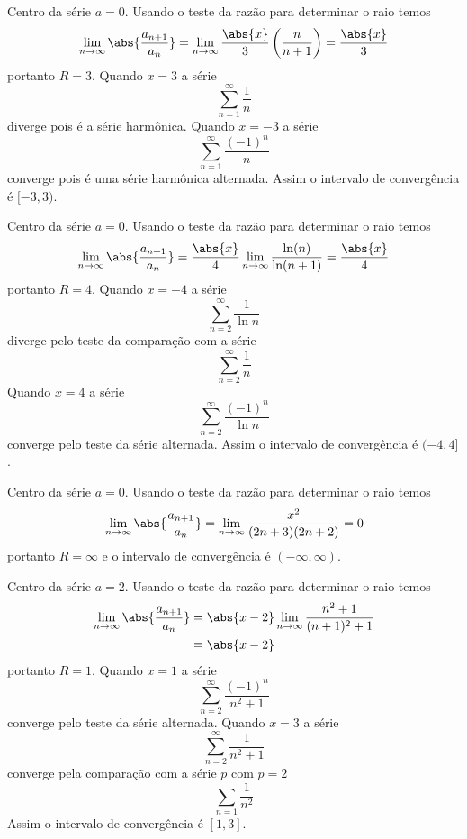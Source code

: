 \begin{exercises}
\begin{exercise}
\begin{answer}
\begin{alphalist}
  \item Centro da série $a=0$.
  Usando o teste da razão para determinar o raio temos
  \[
    \lim_{n\to\infty}\abs{\frac{a_{n+1}}{a_n}} =
    \lim_{n\to\infty} \frac{\abs{x}}{3}\left(\frac{n}{n+1}\right) =
    \frac{\abs{x}}{3}
  \]
  portanto $R=3$.
  Quando $x= 3$ a série
  \[
    \sum_{n=1}^{\infty} \frac{1}{n}
  \]
  diverge pois é a série harmônica.
  Quando $x=-3$ a série
  \[
    \sum_{n=1}^{\infty} \frac{(-1)^n}{n}
  \]
  converge pois é uma série harmônica alternada.
  Assim o intervalo de convergência é $[-3, 3)$.

  \item Centro da série $a=0$.
  Usando o teste da razão para determinar o raio temos
  \[
    \lim_{n\to\infty}\abs{\frac{a_{n+1}}{a_n}} =
    \frac{\abs{x}}{4}\lim_{n\to\infty}\frac{\ln(n)}{\ln(n+1)} =
    \frac{\abs{x}}{4}
  \]
  portanto $R=4$.
  Quando $x=-4$ a série
  \[
    \sum_{n=2}^{\infty} \frac{1}{\ln n}
  \]
  diverge pelo teste da comparação com a série
  \[
    \sum_{n=2}^{\infty}\frac{1}{n}
  \]
  Quando $x= 4$ a série
  \[
    \sum_{n=2}^{\infty} \frac{(-1)^n}{\ln n}
  \]
  converge pelo teste da série alternada.
  Assim o intervalo de convergência é $(-4, 4]$.

  \item Centro da série $a=0$.
  Usando o teste da razão para determinar o raio temos
  \[
    \lim_{n\to\infty}\abs{\frac{a_{n+1}}{a_n}} =
    \lim_{n\to\infty} \frac{x^2}{(2n+3)(2n+2)} = 0
    \]
  portanto $R=\infty$ e o intervalo de convergência é $(-\infty, \infty)$.

  \item Centro da série $a=2$.
  Usando o teste da razão para determinar o raio temos
  \begin{align*}
  	\lim_{n\to\infty}\abs{\frac{a_{n+1}}{a_n}}
      & = \abs{x-2} \lim_{n\to\infty} \frac{n^2+1}{(n+1)^2+1} \\
  	  & = \abs{x-2}
  \end{align*}
  portanto $R=1$.
  Quando $x=1$ a série
  \[
    \sum_{n=2}^{\infty} \frac{(-1)^n}{n^2+1}
  \]
  converge pelo teste da série alternada.
  Quando $x=3$ a série
  \[
    \sum_{n=2}^{\infty} \frac{1}{n^2+1}
  \]
  converge pela comparação com a série $p$ com $p=2$
  \[
    \sum_{n=1}\frac{1}{n^2}
  \]
  Assim o intervalo de convergência é $[1, 3]$.


\end{alphalist}
\end{answer}
\end{exercise}
\end{exercises}
